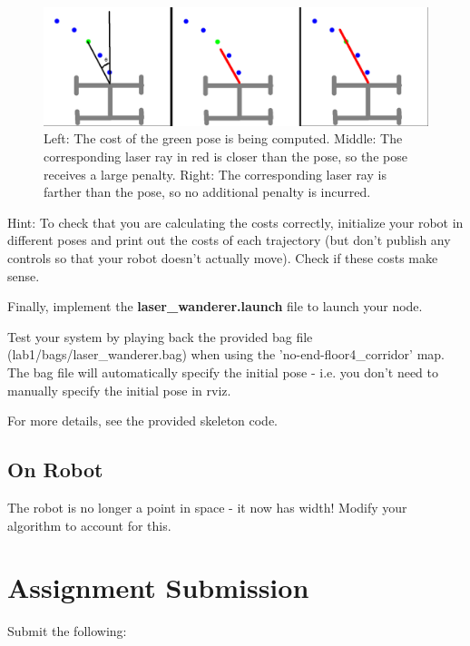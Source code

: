 \documentclass[final]{article}
\begin{document}
\begin{figure}[h]
\centering
\includegraphics[width=\linewidth]{figs/scan_cost.png}
\caption{Left: The cost of the green pose is being computed. Middle: The corresponding laser ray in red is closer than the pose, so the pose receives a large penalty. Right: The corresponding laser ray is farther than the pose, so no additional penalty is incurred. }
\label{fig:scan_cost}
\end{figure}


Hint: To check that you are calculating the costs correctly, initialize your robot in different poses and print out the costs of each trajectory (but don't publish any controls so that your robot doesn't actually move). Check if these costs make sense.

Finally, implement the \textbf{laser\_wanderer.launch} file to launch your node.

Test your system by playing back the provided bag file (lab1/bags/laser\_wanderer.bag) when using the 'no-end-floor4\_corridor' map. The bag file will automatically specify the initial pose - i.e. you don't need to manually specify the initial pose in rviz. 

For more details, see the provided skeleton code.

\subsection{On Robot}

The robot is no longer a point in space - it now has width! Modify your algorithm to account for this. 

\newpage

\section{Assignment Submission}

Submit the following:
\end{document}
